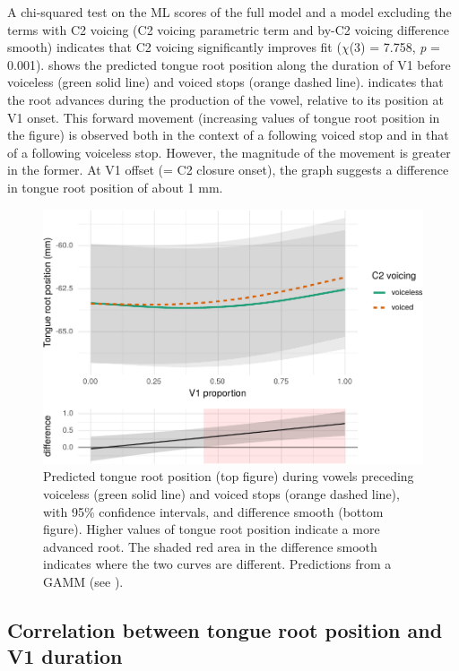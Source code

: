 \documentclass[preprint]{JASAnew}
\begin{document}
A chi-squared test on the ML scores of the full model and a model
excluding the terms with C2 voicing (C2 voicing parametric term and
by-C2 voicing difference smooth) indicates that C2 voicing significantly
improves fit (\(\chi\)(3) = 7.758, \emph{p} = 0.001). 
shows the predicted tongue root position along the duration of V1 before
voiceless (green solid line) and voiced stops (orange dashed line).
 indicates that the root advances during the production
of the vowel, relative to its position at V1 onset. This forward
movement (increasing values of tongue root position in the figure) is
observed both in the context of a following voiced stop and in that of a
following voiceless stop. However, the magnitude of the movement is
greater in the former. At V1 offset (= C2 closure onset), the graph
suggests a difference in tongue root position of about 1 mm.

\begin{figure}
\includegraphics[width=\linewidth]{./Figure4-1} \caption{Predicted tongue root position (top figure) during vowels preceding voiceless (green solid line) and voiced stops (orange dashed line), with 95\% confidence intervals, and difference smooth (bottom figure). Higher values of tongue root position indicate a more advanced root. The shaded red area in the difference smooth indicates where the two curves are different. Predictions from a GAMM (see ).}\label{f:Figure4}
\end{figure}

\hypertarget{correlation-between-tongue-root-position-and-v1-duration}{%
\subsection{Correlation between tongue root position and V1
duration}\label{correlation-between-tongue-root-position-and-v1-duration}}
\end{document}
